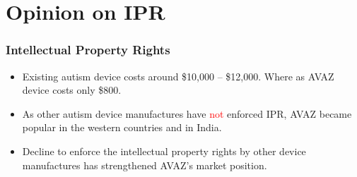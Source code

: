 \documentclass[12pt]{beamer}
\begin{document}
\section{Opinion on IPR}
{
\begin{frame}
	\frametitle {Intellectual Property Rights}
	\begin{itemize}
		\item Existing autism device costs around \$10,000 -- \$12,000. Where as AVAZ device costs only \$800. 
		\item As other autism device manufactures have \textcolor{red}{not} enforced IPR, AVAZ became popular in the western countries and in India. 
		\item Decline to enforce the intellectual property rights by other device manufactures has strengthened AVAZ's market position.
	\end{itemize}
\end{frame}
}
\end{document}

